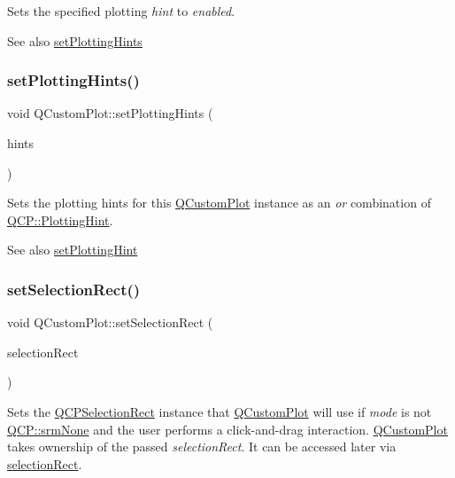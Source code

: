 Sets the specified plotting {\itshape hint} to {\itshape enabled}.

\begin{DoxySeeAlso}{See also}
\mbox{\hyperlink{class_q_custom_plot_a94a33cbdadbbac5934843508bcfc210d}{set\+Plotting\+Hints}} 
\end{DoxySeeAlso}
\mbox{\label{class_q_custom_plot_a94a33cbdadbbac5934843508bcfc210d}} 
\subsubsection{\texorpdfstring{setPlottingHints()}{setPlottingHints()}}
{\footnotesize\ttfamily void Q\+Custom\+Plot\+::set\+Plotting\+Hints (\begin{DoxyParamCaption}\item[{const Q\+C\+P\+::\+Plotting\+Hints \&}]{hints }\end{DoxyParamCaption})}

Sets the plotting hints for this \mbox{\hyperlink{class_q_custom_plot}{Q\+Custom\+Plot}} instance as an {\itshape or} combination of \mbox{\hyperlink{namespace_q_c_p_a5400e5fcb9528d92002ddb938c1f4ef4}{Q\+C\+P\+::\+Plotting\+Hint}}.

\begin{DoxySeeAlso}{See also}
\mbox{\hyperlink{class_q_custom_plot_a3b7c97bb6c16464e9e15190c07abe9a9}{set\+Plotting\+Hint}} 
\end{DoxySeeAlso}
\mbox{\label{class_q_custom_plot_a0c09f96df15faa4799ad7051bb16cf33}} 
\subsubsection{\texorpdfstring{setSelectionRect()}{setSelectionRect()}}
{\footnotesize\ttfamily void Q\+Custom\+Plot\+::set\+Selection\+Rect (\begin{DoxyParamCaption}\item[{\mbox{\hyperlink{class_q_c_p_selection_rect}{Q\+C\+P\+Selection\+Rect}} $\ast$}]{selection\+Rect }\end{DoxyParamCaption})}

Sets the \mbox{\hyperlink{class_q_c_p_selection_rect}{Q\+C\+P\+Selection\+Rect}} instance that \mbox{\hyperlink{class_q_custom_plot}{Q\+Custom\+Plot}} will use if {\itshape mode} is not \mbox{\hyperlink{namespace_q_c_p_ac9aa4d6d81ac76b094f9af9ad2d3aacfa9032f170490d67240a6c68c2638ffab1}{Q\+C\+P\+::srm\+None}} and the user performs a click-\/and-\/drag interaction. \mbox{\hyperlink{class_q_custom_plot}{Q\+Custom\+Plot}} takes ownership of the passed {\itshape selection\+Rect}. It can be accessed later via \mbox{\hyperlink{class_q_custom_plot_ad7df2bcbba307e644db383b449e31efd}{selection\+Rect}}.

